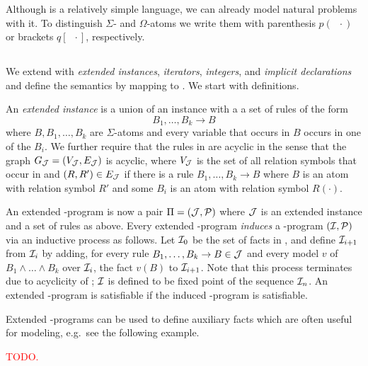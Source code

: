 \documentclass[runningheads]{llncs}
\begin{document}
{\color{red} Although \bcore is a relatively simple language, we can
already model natural problems with it. To distinguish $\Sigma$- and
$\Omega$-atoms we write them with parenthesis $p(\;\;\cdot)$ or brackets
$q[\;\;\cdot]$,
respectively.


%  

}


\subsection{\bfull}

We extend \bcore with \emph{extended instances}, \emph{iterators},
\emph{integers}, and \emph{implicit declarations} and define the
semantics by mapping to \bcore. We start with definitions. 

An \emph{extended instance \Jmc} is a union of an instance \Imc with a
a set of rules of the form
%
\[B_1,\ldots,B_k\rightarrow B\]
%
where $B,B_1,\ldots,B_k$ are $\Sigma$-atoms and every variable that
occurs in $B$ occurs in one of the $B_i$. We further require that the
rules in \Jmc are acyclic in the sense that the graph $G_\mathcal{J} = (V_\mathcal{J},E_\mathcal{J})$ is
acyclic, where $V_\mathcal{J}$ is the set of all relation symbols that occur in
\Jmc and $(R,R')\in E_\mathcal{J}$ if there is a rule
$B_1,\ldots,B_k\rightarrow B$ where $B$ is an atom with relation
symbol $R'$ and some $B_i$ is an atom with relation symbol $R(\cdot)$.  

An extended \bcore-program is now a pair $\Pi=(\mathcal{J},\mathcal{P})$ where
$\mathcal{J}$ is an extended instance and \Pmc a set of rules as above. Every
extended \bcore-program \emph{induces} a \bcore-program $(\mathcal{I},\mathcal{P})$
via an inductive process as follows. Let $\mathcal{I}_0$ be the set of facts
in \Jmc, and define $\mathcal{I}_{i+1}$ from $\mathcal{I}_i$ by adding, for every
rule $B_1,\ldots,B_k\rightarrow B\in \mathcal{J}$ and every model $v$ of
$B_1\wedge \ldots \wedge B_k$ over $\mathcal{I}_i$, the fact $v(B)$ to
$\mathcal{I}_{i+1}$. Note that this process terminates due to acyclicity of
\Jmc; $\mathcal{I}$ is defined to be fixed point of the sequence $\mathcal{I}_n$. An
extended \bcore-program is satisfiable if the induced \bcore-program
is satisfiable. 

Extended \bcore-programs can be used to define auxiliary facts which
are often useful for modeling, e.g.~see the following example. 
%
\begin{example}
  \textcolor{red}{TODO.}
\end{example}
\end{document}
